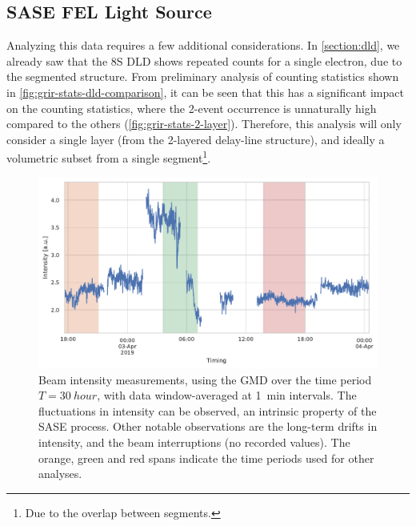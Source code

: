 \subsection{SASE FEL Light Source}
Analyzing this data requires a few additional considerations. In \cref{section:dld}, we already saw that the \num{8}S \gls{DLD} shows repeated counts for a single electron, due to the segmented structure. From preliminary analysis of counting statistics shown in \cref{fig:grir-stats-dld-comparison}, it can be seen that this has a significant impact on the counting statistics, where the \num{2}-event occurrence is unnaturally high compared to the others (\cref{fig:grir-stats-2-layer}). Therefore, this analysis will only consider a single layer (from the 2-layered delay-line structure), and ideally a volumetric subset from a single segment\footnote{Due to the overlap between segments.}.



\begin{figure}
    \centering
    \includegraphics[width=0.8\linewidth]{images/gmd_grir.pdf}
    \caption{Beam intensity measurements, using the \gls{GMD} over the time period $T=\qty{30}{hour}$, with data window-averaged at \qty{1}{min} intervals. The fluctuations in intensity can be observed, an intrinsic property of the \gls{SASE} process. Other notable observations are the long-term drifts in intensity, and the beam interruptions (no recorded values). The orange, green and red spans indicate the time periods used for other analyses.}
    \label{fig:gmd-intensity}
\end{figure}


